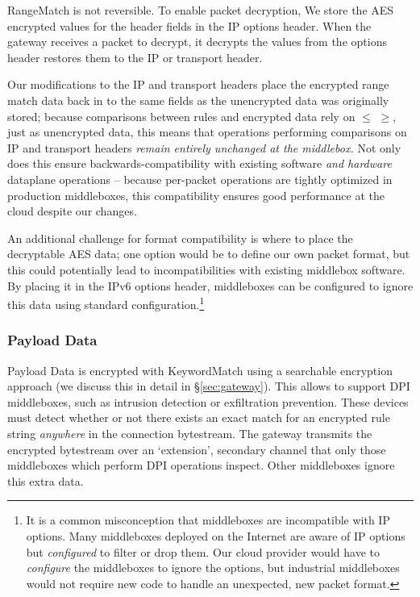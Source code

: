  RangeMatch is not reversible. To enable packet decryption, We store the AES encrypted values for the header fields in the IP options header. When the gateway receives a packet to decrypt, it decrypts the values from the options header restores them to the IP or transport header.

Our modifications to the IP and transport headers place the encrypted range match data back in to the same fields as the unencrypted data was originally stored; because comparisons between rules and encrypted data rely on $\leq$ $\geq$, just as unencrypted data, this means that operations performing comparisons on IP and transport headers {\it remain entirely unchanged at the middlebox.}
Not only does this ensure backwards-compatibility with existing software {\it and hardware} dataplane operations -- because per-packet operations are tightly optimized in production middleboxes, this compatibility ensures good performance at the cloud despite our changes.

An additional challenge for format compatibility is where to place the decryptable AES data; one option would be to define our own packet format, but this could potentially lead to incompatibilities with existing middlebox software. By placing it in the IPv6 options header, middleboxes can be configured to ignore this data using standard configuration.\footnote{It is a common misconception that middleboxes are incompatible with IP options. Many middleboxes deployed on the Internet are aware of IP options but {\it configured} to filter or drop them. Our cloud provider would have to {\it configure} the middleboxes to ignore the options, but industrial middleboxes would not require new code to handle an unexpected, new packet format.}


\subsubsection{Payload Data} 
Payload Data is encrypted with KeywordMatch using a searchable encryption approach (we discuss this in detail in \S\ref{sec:gateway}). This allows \sys to support DPI middleboxes, such as intrusion detection or exfiltration prevention.
These devices must detect whether or not there exists an exact match for an encrypted rule string {\it anywhere} in the connection bytestream.
The gateway transmits the encrypted bytestream over an `extension', secondary channel that only those middleboxes which perform DPI operations inspect. 
Other middleboxes ignore this extra data.

